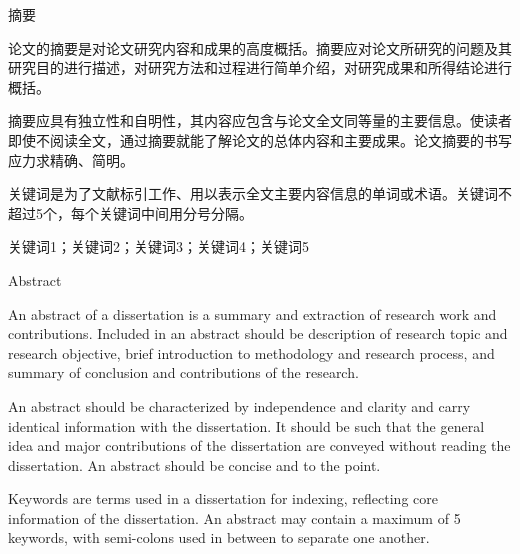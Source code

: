 \documentclass[12pt,a4paper]{ctexart}
\begin{document}
\newpage
\clearpage
{}
\setcounter{page}{2}

\enlargethispage{\baselineskip}
\vspace*{-\topskip}
\begin{center}
    \heiti {} 摘\hspace{1em}要
\end{center}
\vspace{0.1cm}

 \songti 
\noindent\hspace{2em}论文的摘要是对论文研究内容和成果的高度概括。摘要应对论文所研究的问题及其研究目的进行描述，对研究方法和过程进行简单介绍，对研究成果和所得结论进行概括。
    
\noindent\hspace{2em}摘要应具有独立性和自明性，其内容应包含与论文全文同等量的主要信息。使读者即使不阅读全文，通过摘要就能了解论文的总体内容和主要成果。论文摘要的书写应力求精确、简明。
    
\noindent\hspace{2em}关键词是为了文献标引工作、用以表示全文主要内容信息的单词或术语。关键词不超过5个，每个关键词中间用分号分隔。
    
\vspace{1em}
\songti 关键词1；关键词2；关键词3；关键词4；关键词5

\newpage
\enlargethispage{\baselineskip}
\vspace*{-\topskip}
\begin{center}
    \heiti {} Abstract
\end{center}
\vspace{0.1cm}

\selectfont
{} 
\noindent\hspace{2em}An abstract of a dissertation is a summary and extraction of research work and contributions. Included in an abstract should be description of research topic and research objective, brief introduction to methodology and research process, and summary of conclusion and contributions of the research.

\noindent\hspace{2em}An abstract should be characterized by independence and clarity and carry identical information with the dissertation. It should be such that the general idea and major contributions of the dissertation are conveyed without reading the dissertation. An abstract should be concise and to the point.

\noindent\hspace{2em}Keywords are terms used in a dissertation for indexing, reflecting core information of the dissertation. An abstract may contain a maximum of 5 keywords, with semi-colons used in between to separate one another.
\end{document}
